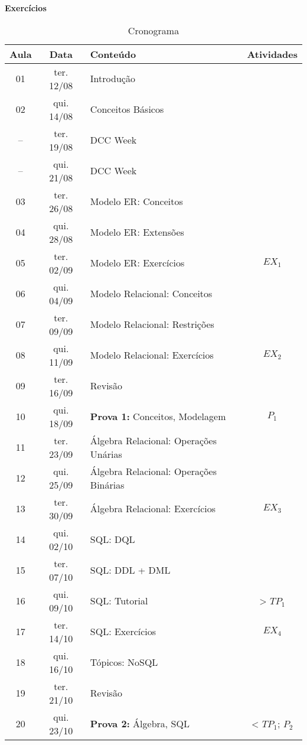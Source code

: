 \documentclass[12pt, a4paper]{article}
\begin{document}
\textbf{Exercícios}


\begin{table}[!htbp] \centering \caption{Cronograma} \label{tab:cronograma}
    \begin{tabular}{|c|c|l|c|}
    \hline
        \textbf{Aula} & \textbf{Data} & \textbf{Conteúdo} & \textbf{Atividades} \\ \hline
        01 & ter. 12/08 & Introdução & ~ \\ \hline
        02 & qui. 14/08 & Conceitos Básicos & ~ \\ \hline
        -- & ter. 19/08 & DCC Week & ~ \\ \hline
        -- & qui. 21/08 & DCC Week & ~ \\ \hline
        03 & ter. 26/08 & Modelo ER: Conceitos & ~ \\ \hline
        04 & qui. 28/08 & Modelo ER: Extensões & ~ \\ \hline
        05 & ter. 02/09 & Modelo ER: Exercícios & $EX_1$ \\ \hline
        06 & qui. 04/09 & Modelo Relacional: Conceitos & ~ \\ \hline
        07 & ter. 09/09 & Modelo Relacional: Restrições & ~ \\ \hline
        08 & qui. 11/09 & Modelo Relacional: Exercícios & $EX_2$ \\ \hline
        09 & ter. 16/09 & Revisão & ~ \\ \hline
        10 & qui. 18/09 & \textbf{Prova 1:} Conceitos, Modelagem & $P_1$ \\ \hline
        11 & ter. 23/09 & Álgebra Relacional: Operações Unárias & ~ \\ \hline
        12 & qui. 25/09 & Álgebra Relacional: Operações Binárias & ~ \\ \hline
        13 & ter. 30/09 & Álgebra Relacional: Exercícios & $EX_3$ \\ \hline
        14 & qui. 02/10 & SQL: DQL & ~ \\ \hline
        15 & ter. 07/10 & SQL: DDL + DML & ~ \\ \hline
        16 & qui. 09/10 & SQL: Tutorial & > $TP_1$ \\ \hline
        17 & ter. 14/10 & SQL: Exercícios & $EX_4$ \\ \hline
        18 & qui. 16/10 & Tópicos: NoSQL & ~ \\ \hline
        19 & ter. 21/10 & Revisão & ~ \\ \hline
        20 & qui. 23/10 & \textbf{Prova 2:} Álgebra, SQL & < $TP_1$; $P_2$ \\ \hline

\end{tabular}
\end{table}
\end{document}
